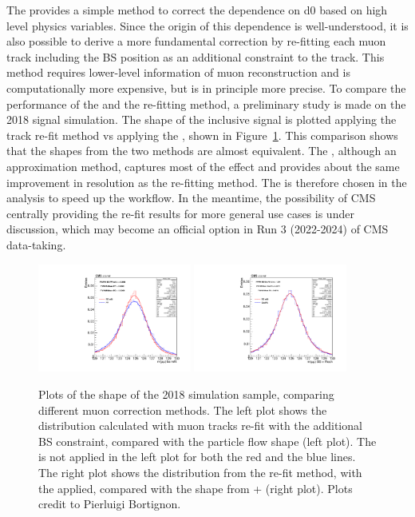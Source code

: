 The \GeoFit provides a simple method to correct the \pt dependence on d0 based on high level physics variables.
Since the origin of this \pt dependence is well-understood, it is also possible to derive a more fundamental correction
by re-fitting each muon track including the BS position as an additional constraint to the track.
This method requires lower-level information of muon reconstruction and is computationally more expensive,
but is in principle more precise.
To compare the performance of the \GeoFit and the re-fitting method, a preliminary study is made on the 2018 \ggH signal simulation.
The \mmm shape of the inclusive signal is plotted applying the track re-fit method vs applying the \GeoFit, shown in Figure~\ref{fig:refit_vs_geofit}.
This comparison shows that the \mmm shapes from the two methods are almost equivalent.
The \GeoFit, although an approximation method, captures most of the effect and provides about the same improvement in \mmm resolution as the re-fitting method.
The \GeoFit is therefore chosen in the \hmm analysis to speed up the workflow.
In the meantime, the possibility of CMS centrally providing the re-fit results for more general use cases is under discussion,
which may become an official option in Run 3 (2022-2024) of CMS data-taking.

\begin{figure}[!htb]
      \centering
      \captionsetup{justification=justified}
      \includegraphics[width=0.45\textwidth]{pics/muon_corr/GeoFit/track_refit/ggH_mass_muon_fit_bs_pf_2018.pdf}
      \includegraphics[width=0.45\textwidth]{pics/muon_corr/GeoFit/track_refit/ggH_mass_muon_fit_bs_geofit_2018.pdf}
      \caption{Plots of the \mmm shape of the 2018 \ggH simulation sample, comparing different muon correction methods.
               The left plot shows the \mmm distribution calculated with muon tracks re-fit with the additional BS constraint, 
               compared with the particle flow shape (left plot).
               The \RochCorr is not applied in the left plot for both the red and the blue lines.
               The right plot shows the \mmm distribution from the re-fit method, with the \RochCorr applied,
               compared with the shape from \GeoFit + \RochCorr (right plot).
               Plots credit to Pierluigi Bortignon.}
      \label{fig:refit_vs_geofit}
\end{figure}

